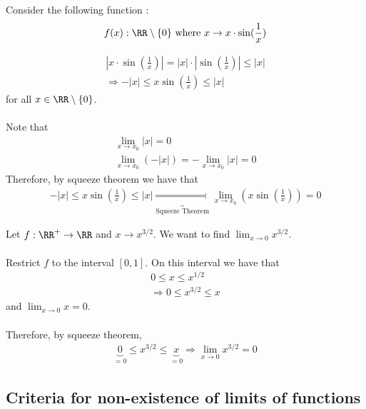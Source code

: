 \documentclass[class=scrartcl, crop=false]{standalone}
\begin{document}
\begin{example}
  Consider the following function :
  \begin{gather*}
    f(x) : \RR \setminus \{0\} \ \text{where} \  x \to x \cdot \sin(\frac{1}{x})
  \end{gather*} 
  \begin{soln}
    \begin{gather*}
      |x \cdot \sin(\frac{1}{x})| = |x| \cdot |\sin(\frac{1}{x})| \leq |x|
      \\
      \Rightarrow
      -|x| \leq x \sin(\frac{1}{x}) \leq |x|
    \end{gather*} for all $x \in \RR \setminus \{0\}$.
    \\\\
    Note that
    \begin{gather*}
      \lim_{x \to x_0} |x| = 0 \\
      \lim_{x \to x_0}(-|x|) = -\lim_{x \to x_0}|x| = 0
    \end{gather*} 
    Therefore, by squeeze theorem we have that
    \begin{gather*}
      -|x| \leq x \sin(\frac{1}{x}) \leq |x| \underbrace{\Rightarrow}_{\text{Squeeze Theorem}} \lim_{x \to x_0}(x \sin(\frac{1}{x})) = 0
    \end{gather*} 
  \end{soln} 
\end{example} 
\begin{example}
  Let $f: \RR^+ \to \RR$ and $x \to x^{3 / 2}$. We want to find $\lim_{x \to 0}x^{3 / 2}$.
  \\\\
  Restrict $f$ to the interval $[0, 1]$. On this interval we have that
  \begin{gather*}
    0 \leq x \leq x^{1 / 2} \\
    \Rightarrow 0 \leq x^{3 / 2} \leq x
  \end{gather*} and $\lim_{x \to 0} x = 0$.
  \\\\
  Therefore, by squeeze theorem,
  \begin{gather*}
    \underbrace{0}_{=0} \leq x^{3 / 2} \leq \underbrace{x}_{=0} \Rightarrow \lim_{x \to 0}x^{3 / 2} = 0
  \end{gather*} 
\end{example} 

\subsection{Criteria for non-existence of limits of functions}
\end{document}
